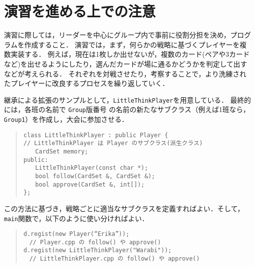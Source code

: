 
\section*{演習を進める上での注意}
演習に際しては，リーダーを中心にグループ内で事前に役割分担を決め，プログラムを作成すること．
演習では，まず，何らかの戦略に基づくプレイヤーを複数実装する．
例えば，現在は1枚しか出せないが，複数のカード(ペアや3カードなど)を出せるようにしたり，選んだカードが場に通るかどうかを判定して出すなどが考えられる．
それぞれを対戦させたり，考察することで，より洗練されたプレイヤーに改良するプロセスを繰り返していく．

継承による拡張のサンプルとして，\verb+LittleThinkPlayer+を用意している．
最終的には，各班の名前で \verb+Group+版番号 の名前の新たなサブクラス（例えば1班なら，\verb+Group1+）を作成し，大会に参加させる．
\begin{quote}
\begin{verbatim}
class LittleThinkPlayer : public Player {
// LittleThinkPlayer は Player のサブクラス(派生クラス)
　　CardSet memory;
public:
　　LittleThinkPlayer(const char *);
　　bool follow(CardSet &, CardSet &);
　　bool approve(CardSet &, int[]);
};
\end{verbatim}
\end{quote}
この方法に基づき，戦略ごとに適当なサブクラスを定義すればよい．そして，\verb+main+関数で，以下のように使い分ければよい．
\begin{quote}
\begin{verbatim}
d.regist(new Player(“Erika”)); 　
　// Player.cpp の follow() や approve() 
d.regist(new LittleThinkPlayer("Warabi")); 
　// LittleThinkPlayer.cpp の follow() や approve() 
\end{verbatim}
\end{quote}

